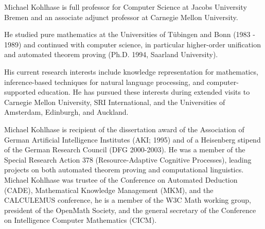 \begin{participant}[type=leadPI,gender=male]{Michael Kohlhase}
  is full professor for Computer Science at Jacobs University Bremen
  and an associate adjunct professor at Carnegie Mellon University.

  He studied pure mathematics at the Universities of T\"ubingen and Bonn (1983 - 1989) and
  continued with computer science, in particular higher-order unification and automated
  theorem proving (Ph.D. 1994, Saarland University).

  His current research interests include knowledge representation for mathematics,
  inference-based techniques for natural language processing, and computer-supported
  education. He has pursued these interests during extended visits to Carnegie Mellon
  University, SRI International, and the Universities of Amsterdam, Edinburgh, and
  Auckland.

  Michael Kohlhase is recipient of the dissertation award of the Association of German
  Artificial Intelligence Institutes (AKI; 1995) and of a Heisenberg stipend of the German
  Research Council (DFG 2000-2003). He was a member of the Special Research Action 378
  (Resource-Adaptive Cognitive Processes), leading projects on both automated theorem
  proving and computational linguistics. Michael Kohlhase was trustee of the Conference on
  Automated Deduction (CADE), Mathematical Knowledge Management (MKM), and the CALCULEMUS
  conference, he is a member of the W3C Math working group, president of the OpenMath
  Society, and the general secretary of the Conference on Intelligence Computer
  Mathematics (CICM).
\end{participant}



 


